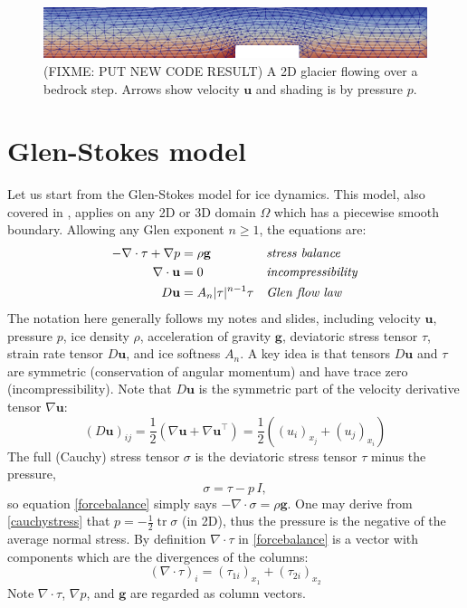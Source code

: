 \documentclass[letterpaper,final,12pt,reqno]{amsart}
\newcommand{\grad}{\nabla}
\newcommand{\Div}{\nabla\cdot}
\newcommand{\trace}{\operatorname{tr}}
\newcommand{\bg}{\mathbf{g}}
\newcommand{\bu}{\mathbf{u}}
\begin{document}
\begin{figure}[h]
\includegraphics[width=\textwidth,angle=-5.7296]{stepflowlin}  %
\caption{(FIXME: PUT NEW CODE RESULT)  A 2D glacier flowing over a bedrock step.  Arrows show velocity $\bu$ and shading is by pressure $p$.}
\label{fig:glacier:bedstep}
\end{figure}

\section{Glen-Stokes model} \label{sec:stokes}

Let us start from the Glen-Stokes model for ice dynamics.  This model, also covered in \cite{GreveBlatter2009,JouvetRappaz2011}, applies on any 2D or 3D domain $\Omega$ which has a piecewise smooth boundary.  Allowing any Glen exponent $n\ge 1$, the equations are:
\begin{align}
- \nabla \cdot \tau + \nabla p &= \rho \bg &&\text{\emph{stress balance}} \label{forcebalance} \\
\nabla \cdot \bu &= 0 &&\text{\emph{incompressibility}} \label{incompressible} \\
D\bu &= A_n |\tau|^{n-1} \tau &&\text{\emph{Glen flow law}} \label{flowlaw}
\end{align}
The notation here generally follows my notes and slides, including velocity $\bu$, pressure $p$, ice density $\rho$, acceleration of gravity $\bg$, deviatoric stress tensor $\tau$, strain rate tensor $D\bu$, and ice softness $A_n$.  A key idea is that tensors $D\bu$ and $\tau$ are symmetric (conservation of angular momentum) and have trace zero (incompressibility).  Note that $D\bu$ is the symmetric part of the velocity derivative tensor $\grad \bu$:
\begin{equation}
(D\bu)_{ij} = \frac{1}{2} \left(\grad\bu + \grad\bu^\top\right) = \frac{1}{2} \left((u_i)_{x_j} + (u_j)_{x_i}\right) \label{strainrate}
\end{equation}
The full (Cauchy) stress tensor $\sigma$ is the deviatoric stress tensor $\tau$ minus the pressure,
\begin{equation}
    \sigma = \tau - p\,I,  \label{cauchystress}
\end{equation}
so equation \eqref{forcebalance} simply says $-\Div \sigma = \rho \bg$.  One may derive from \eqref{cauchystress} that $p = -\frac{1}{2} \trace \sigma$ (in 2D), thus the pressure is the negative of the average normal stress.  By definition $\Div\tau$ in \eqref{forcebalance} is a vector with components which are the divergences of the columns:
\begin{equation}
    \left(\nabla \cdot \tau\right)_i = \left(\tau_{1i}\right)_{x_1} + \left(\tau_{2i}\right)_{x_2}  \label{divtaudefn}
\end{equation}
Note $\nabla\cdot \tau$, $\nabla p$, and $\bg$ are regarded as column vectors.
\end{document}
